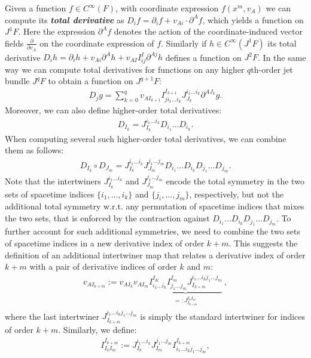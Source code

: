 Given a function $f \in C^{\infty}(F)$, with coordinate expression $f(x^m, v_A)$ we can compute its \textit{\textbf{total derivative}} as $D_if = \partial_i f + v_{Ai}\cdot \partial^A f$, which yields a function on $J^1F$. Here the expression $\partial^A f$ denotes the action of the coordinate-induced vector fields $\frac{\partial}{\partial v_A}$ on the coordinate expression of $f$. Similarly if $h \in C^{\infty}(J^1F)$ its total derivative $D_i h = \partial_i h + v_{Ai} \partial^A h + v_{AI}I^I_{ij} \partial ^{Aj} h$ defines a function on $J^2F$. In the same way we can compute total derivatives for functions on any higher $q$th-order jet bundle $J^qF$ to obtain a function on $J^{q+1}F$:
\begin{align}\label{totDer}
    D_j g = \sum _{k = 0}^{q}  v_{AI_{k+1}}I^{I_{k+1}}_{ji_1...i_k}J_{J_k}^{i_1...i_k}\partial^{AJ_k} g.
\end{align}
Moreover, we can also define higher-order total derivatives:
\begin{align}\label{highrTotder}
    D_{I_k} = J_{I_k}^{i_1...i_k}D_{i_1} ...  D_{i_k}.
\end{align}
When computing several such higher-order total derivatives, we can combine them as follows:
\begin{align}
D_{I_k} \circ D_{J_m} = J_{I_k}^{i_1...i_k}J_{J_m}^{j_1...j_m}D_{i_1}  ...  D_{i_k}  D_{j_1}  ...  D_{j_m}.
\end{align}
Note that the intertwiners $J_{I_k}^{i_1...i_k}$ and $J_{J_m}^{j_1...j_m}$ encode the total symmetry in the two sets of spacetime indices $\{i_1,...,i_k\}$ and $\{j_i,...,j_m\}$, respectively, but not the additional total symmetry w.r.t. any permutation of spacetime indices that mixes the two sets, that is enforced by the contraction against $D_{i_1}  ...  D_{i_k}  D_{j_1}  ...  D_{j_m}$.
To further account for such additional symmetries, we need to combine the two sets of spacetime indices in a new derivative index of order $k+m$. This suggests the definition of an additional intertwiner map that relates a derivative index of order $k+m$ with a pair of derivative indices of order $k$ and $m$:
\begin{align}
   v_{AI_{k+m}} := v_{AI_k} v_{AI_m}
   \underbrace{I^{I_K}_{i_1...i_k}I^{I_m}_{j_1...j_m}J^{i_1...i_k j_1...j_m}_{I_{k+m}}}_{\substack{=: J^{I_k I_m}_{I_{k+m}}}}  \   ,
\end{align}
where the last intertwiner $J^{i_1...i_k j_1...j_m}_{I_{k+m}}$ is simply the standard intertwiner for indices of order $k+m$.
Similarly, we define:
\begin{align}
    I^{I_{k+m}}_{I_k I_m} := J_{I_k}^{i_1...i_k}J_{I_m}^{j_1...j_m}I^{I_{k+m} }_{i_1...i_k j_1...j_m},
\end{align}
